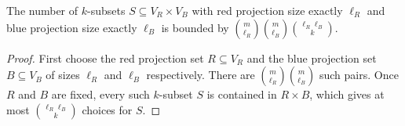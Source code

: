 \begin{helper}
The number of \(k\)-subsets \(S \subseteq V_R \times V_B\) with red projection size exactly \(\ell_R\) and blue projection size exactly \(\ell_B\) is bounded by \(\binom{m}{\ell_R}\binom{m}{\ell_B}\binom{\ell_R\ell_B}{k}\).
\end{helper}
\begin{proof}
First choose the red projection set \(R\subseteq V_R\) and the blue projection set \(B\subseteq V_B\) of sizes \(\ell_R\) and \(\ell_B\) respectively. There are \(\binom{m}{\ell_R}\binom{m}{\ell_B}\) such pairs. Once \(R\) and \(B\) are fixed, every such \(k\)-subset \(S\) is contained in \(R\times B\), which gives at most \(\binom{\ell_R\ell_B}{k}\) choices for \(S\).
\end{proof}